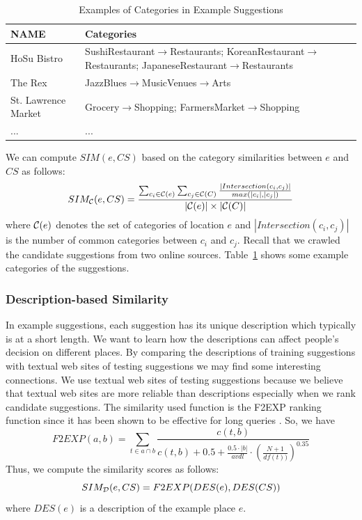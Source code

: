 \begin{table}[t]
\begin{center}
\caption{Examples of Categories in Example Suggestions}\label{tb:category_example}
\begin{tabular}{ | l | p{6.5cm} |}
\hline
\textbf{NAME} & \textbf{Categories} \\ 
\hline
\hline
HoSu Bistro & SushiRestaurant$\to$Restaurants;
             KoreanRestaurant$\to$Restaurants;
            JapaneseRestaurant$\to$Restaurants
\\ 
\hline
The Rex & JazzBlues$\to$MusicVenues$\to$Arts 
\\ 
\hline
St. Lawrence Market & Grocery$\to$Shopping;
                    FarmersMarket$\to$Shopping 
\\ 
\hline
... & ... \\
\hline
\end{tabular}
\end{center}
\end{table}
We can compute $SIM(e,CS)$ based on the category similarities between 
$e$ and $CS$ as follows: 
\begin{equation}
SIM_{\cal C}(e,CS) = \frac{ \sum_{c_i \in {\cal C}(e)} \sum_{c_j \in {\cal C}(C)} \frac{|Intersection(c_i,c_j)|}{max(|c_i|,|c_j|)}}{|{\cal C}(e)| \times |{\cal C}(C)|} 
\label{chap5_eq2}
\end{equation}
where
${\cal C}(e)$ denotes the set of categories of location $e$ and
$|Intersection(c_i,c_j)|$ is the number of common categories 
between $c_i$ and $c_j$. 
Recall that we crawled the candidate suggestions from two online 
sources. Table~\ref{tb:category_example} shows some example categories 
of the suggestions.

\subsubsection{Description-based Similarity}
In example suggestions, each suggestion has its unique 
description which typically is at a short length. We want 
to learn how the descriptions can affect people's decision 
on different places. By comparing the descriptions of training 
suggestions with textual web sites of testing suggestions we 
may find some interesting connections. We use textual web sites 
of testing suggestions because we believe that textual web sites 
are more reliable than descriptions especially when we rank 
candidate suggestions. The similarity used function is 
the F2EXP ranking function \cite{Fang:2005:EAA:1076034.1076116} since it has been shown to be effective 
for long queries \cite{Fang:2005:EAA:1076034.1076116}. So, we have 
\begin{equation}
F2EXP(a,b)=\sum_{t\in{a\cap b}}{\frac{c(t,b)}{c(t,b)+0.5+\frac{0.5\cdot |b|}{avdl}\cdot (\frac{N+1}{df(t))})^{0.35}}}
\label{chap5_eq3}
\end{equation}
Thus, we compute the similarity scores as follows: 
\begin{equation}
SIM_{\cal D}(e,CS) = F2EXP(DES(e),DES(CS))
\label{chap5_eq4}
\end{equation}
where $DES(e)$ is a description of the example place $e$. 


